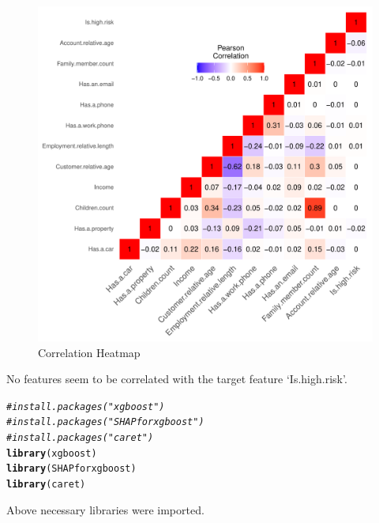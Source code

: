\documentclass{article}\usepackage[]{graphicx}\usepackage[]{xcolor}
\makeatletter
\def\maxwidth{ %
  \ifdim\Gin@nat@width>\linewidth
    \linewidth
  \else
    \Gin@nat@width
  \fi
}
\newcommand{\hlcom}[1]{\textcolor[rgb]{0.678,0.584,0.686}{\textit{#1}}}%
\newcommand{\hldef}[1]{\textcolor[rgb]{0.345,0.345,0.345}{#1}}%
\newcommand{\hlkwd}[1]{\textcolor[rgb]{0.737,0.353,0.396}{\textbf{#1}}}%
\newenvironment{kframe}{%
 \def\at@end@of@kframe{}%
 \ifinner\ifhmode%
  \def\at@end@of@kframe{\end{minipage}}%
  \begin{minipage}{\columnwidth}%
 \fi\fi%
 \def\FrameCommand##1{\hskip\@totalleftmargin \hskip-\fboxsep
 \colorbox{shadecolor}{##1}\hskip-\fboxsep
     \hskip-\linewidth \hskip-\@totalleftmargin \hskip\columnwidth}%
 \MakeFramed {\advance\hsize-\width
   \@totalleftmargin\z@ \linewidth\hsize
   \@setminipage}}%
 {\par\unskip\endMakeFramed%
 \at@end@of@kframe}
\newenvironment{knitrout}{}{} %
\makeatother
\begin{document}
\begin{knitrout}
\begin{figure}[H]
\includegraphics[width=\maxwidth]{figure/unnamed-chunk-38-1} \caption[Correlation Heatmap]{Correlation Heatmap}\label{fig:unnamed-chunk-38}
\end{figure}

\end{knitrout}

No features seem to be correlated with the target feature `Is.high.risk'.\\

\begin{knitrout}
\color{fgcolor}\begin{kframe}
\begin{alltt}
\hlcom{# install.packages("xgboost")}
\hlcom{# install.packages("SHAPforxgboost")}
\hlcom{# install.packages("caret")}
\hlkwd{library}\hldef{(xgboost)}
\hlkwd{library}\hldef{(SHAPforxgboost)}
\hlkwd{library}\hldef{(caret)}
\end{alltt}
\end{kframe}
\end{knitrout}

Above necessary libraries were imported.\\
\end{document}
